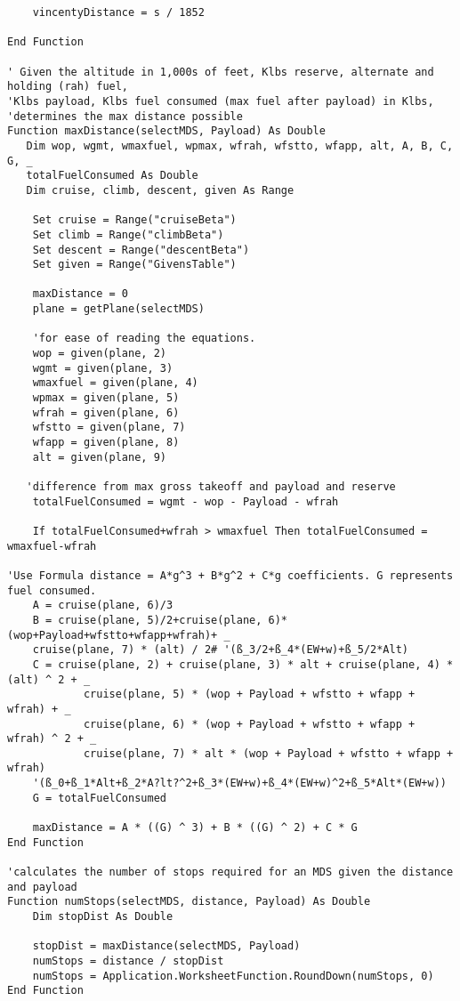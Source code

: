 \begin{lstlisting}
    vincentyDistance = s / 1852

End Function

' Given the altitude in 1,000s of feet, Klbs reserve, alternate and holding (rah) fuel,
'Klbs payload, Klbs fuel consumed (max fuel after payload) in Klbs,
'determines the max distance possible
Function maxDistance(selectMDS, Payload) As Double
   Dim wop, wgmt, wmaxfuel, wpmax, wfrah, wfstto, wfapp, alt, A, B, C, G, _
   totalFuelConsumed As Double
   Dim cruise, climb, descent, given As Range
    
    Set cruise = Range("cruiseBeta")
    Set climb = Range("climbBeta")
    Set descent = Range("descentBeta")
    Set given = Range("GivensTable")
    
    maxDistance = 0
    plane = getPlane(selectMDS)
    
    'for ease of reading the equations.
    wop = given(plane, 2)
    wgmt = given(plane, 3)
    wmaxfuel = given(plane, 4)
    wpmax = given(plane, 5)
    wfrah = given(plane, 6)
    wfstto = given(plane, 7)
    wfapp = given(plane, 8)
    alt = given(plane, 9)
    
   'difference from max gross takeoff and payload and reserve
    totalFuelConsumed = wgmt - wop - Payload - wfrah 
    
    If totalFuelConsumed+wfrah > wmaxfuel Then totalFuelConsumed = wmaxfuel-wfrah
    
'Use Formula distance = A*g^3 + B*g^2 + C*g coefficients. G represents fuel consumed.
    A = cruise(plane, 6)/3
    B = cruise(plane, 5)/2+cruise(plane, 6)*(wop+Payload+wfstto+wfapp+wfrah)+ _
    cruise(plane, 7) * (alt) / 2# '(ß_3/2+ß_4*(EW+w)+ß_5/2*Alt)
    C = cruise(plane, 2) + cruise(plane, 3) * alt + cruise(plane, 4) * (alt) ^ 2 + _
            cruise(plane, 5) * (wop + Payload + wfstto + wfapp + wfrah) + _
            cruise(plane, 6) * (wop + Payload + wfstto + wfapp + wfrah) ^ 2 + _
            cruise(plane, 7) * alt * (wop + Payload + wfstto + wfapp + wfrah)
    '(ß_0+ß_1*Alt+ß_2*A?lt?^2+ß_3*(EW+w)+ß_4*(EW+w)^2+ß_5*Alt*(EW+w))
    G = totalFuelConsumed

    maxDistance = A * ((G) ^ 3) + B * ((G) ^ 2) + C * G
End Function

'calculates the number of stops required for an MDS given the distance and payload
Function numStops(selectMDS, distance, Payload) As Double
    Dim stopDist As Double

    stopDist = maxDistance(selectMDS, Payload)
    numStops = distance / stopDist
    numStops = Application.WorksheetFunction.RoundDown(numStops, 0)
End Function


\end{lstlisting}

